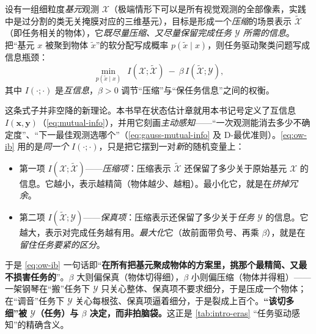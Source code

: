设有一组细粒度\emph{基元}观测 $\mathcal{X}$（极端情形下可以是所有视觉观测的全部像素，实践中是过分割的类无关掩膜对应的三维基元），目标是形成一个\emph{压缩}的场景表示 $\tilde{\mathcal{X}}$（即任务相关的物体），它\emph{既尽量压缩、又尽量保留完成任务 $\mathcal{Y}$ 所需的信息}。把“基元 $x$ 被聚到物体 $\tilde{x}$”的软分配写成概率 $p(\tilde{x}\mid x)$，则任务驱动聚类问题写成信息瓶颈：
\begin{equation}
  \min_{p(\tilde{x}\mid x)}\ \ I(\mathcal{X};\tilde{\mathcal{X}})\ -\ \beta\,I(\tilde{\mathcal{X}};\mathcal{Y}),
  \label{eq:ow-ib}
\end{equation}
其中 $I(\cdot;\cdot)$ 是\emph{互信息}，$\beta>0$ 调节“压缩”与“保任务信息”之间的权衡\cite{maggio2024clio}。

\begin{insight}
这条式子并非空降的新理论。本书早在状态估计章就用本书记号定义了互信息 $I(\mathbf{x},\mathbf{y})$（\cref{eq:mutual-info}），并用它刻画\emph{主动感知}——“一次观测能消去多少不确定度”、“下一最佳观测选哪个”（\cref{eq:gauss-mutual-info} 及 D-最优准则）。\cref{eq:ow-ib} 用的是\emph{同一个} $I(\cdot;\cdot)$，只是把它摆到一对\emph{新}的随机变量上：

\begin{itemize}
  \item 第一项 $I(\mathcal{X};\tilde{\mathcal{X}})$——\emph{压缩项}：压缩表示 $\tilde{\mathcal{X}}$ 还保留了多少关于原始基元 $\mathcal{X}$ 的信息。它越小，表示越精简（物体越少、越粗）。最小化它，就是在\emph{挤掉冗余}。
  \item 第二项 $I(\tilde{\mathcal{X}};\mathcal{Y})$——\emph{保真项}：压缩表示还保留了多少关于\emph{任务} $\mathcal{Y}$ 的信息。它越大，表示对完成任务越有用。\emph{最大化}它（故前面带负号、再乘 $\beta$），就是在\emph{留住任务要紧的区分}。
\end{itemize}

\noindent 于是 \cref{eq:ow-ib} 一句话即“\textbf{在所有把基元聚成物体的方案里，挑那个最精简、又最不损害任务的}”。$\beta$ 大则偏保真（物体切得细），$\beta$ 小则偏压缩（物体并得粗）——一架钢琴在“搬”任务下 $\mathcal{Y}$ 只关心整体、保真项不要求细分，于是压成一个物体；在“调音”任务下 $\mathcal{Y}$ 关心每根弦、保真项逼着细分，于是裂成上百个。\textbf{“该切多细”被 $\mathcal{Y}$（任务）与 $\beta$ 决定，而非拍脑袋。}这正是 \cref{tab:intro-eras} “任务驱动感知”的精确含义。
\end{insight}

